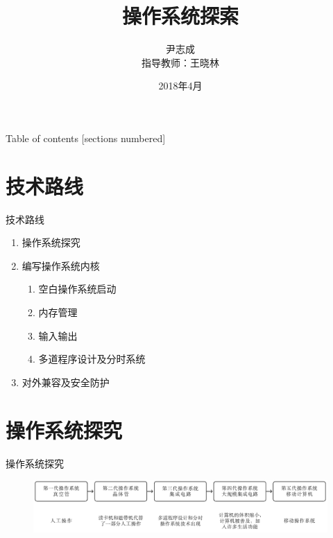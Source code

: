 \documentclass{beamer}
\title{操作系统探索}
\date{2018年4月}
\author{尹志成 \\ 指导教师：王晓林}
\institute{西南林业大学大数据与智能工程学院}
\begin{document}
    \maketitle
    \begin{frame}{Table of contents}
      [sections numbered]
      \tableofcontents[hideallsubsections]
    \end{frame}
    
    \section{技术路线}
    \begin{frame}[fragile]{技术路线}
        \begin{enumerate}
            \item 操作系统探究
            \item 编写操作系统内核
              \begin{enumerate}
                  \item 空白操作系统启动
                  \item 内存管理
                  \item 输入输出
                  \item 多道程序设计及分时系统
              \end{enumerate}
            \item 对外兼容及安全防护
        \end{enumerate}
    \end{frame}

    \section{操作系统探究}
    \begin{frame}{操作系统探究}
      \begin{figure}[H]
        \centering
        \includegraphics[width=\textwidth]{fig/explorer.pdf}
      \end{figure}
    \end{frame}
\end{document}
